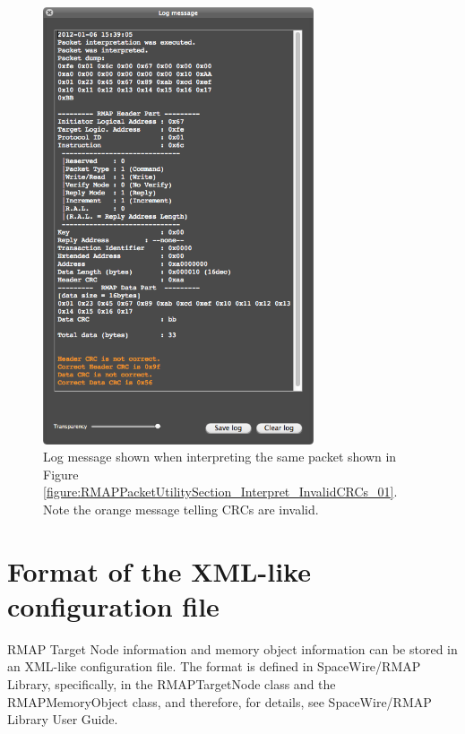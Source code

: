 \documentclass[a4paper,10pt]{article}
\begin{document}
\begin{figure}[htb]
\begin{center}
\includegraphics[width=8cm]{figures/SpaceWireRMAPGUI/RMAPPacketUtilitySection_Interpret_InvalidCRCs_03.png}
\vspace{-2mm}
\caption{Log message shown when interpreting the same packet shown in Figure \ref{figure:RMAPPacketUtilitySection_Interpret_InvalidCRCs_01}. Note the orange message telling CRCs are invalid.}
\label{figure:RMAPPacketUtilitySection_Interpret_InvalidCRCs_03}
\end{center}
\end{figure}


\clearpage

\appendix
\section{Format of the XML-like configuration file}
RMAP Target Node information and memory object information can be stored in an XML-like configuration file.
The format is defined in SpaceWire/RMAP Library, specifically, in the RMAPTargetNode class and the RMAPMemoryObject class, and therefore, for details, see SpaceWire/RMAP Library User Guide.
\end{document}
